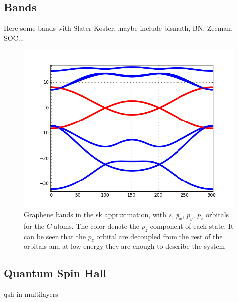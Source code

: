 \subsection{Bands}
Here some bands with Slater-Koster, maybe include bismuth, BN, Zeeman, SOC...
\begin{figure}[h!]
\centering
\includegraphics{chapter04/figures/graphene_bands.png}
\vspace{-5pt}
\caption{Graphene bands in the \ac{sk} approximation, with $s$, $p_x$, $p_y$, $p_z$ orbitals for the $C$ atoms. The color denote the $p_z$ component of each state. It can be seen that the $p_z$ orbital are decoupled from the rest of the orbitals and at low energy they are enough to describe the system}
\label{Gbands}
\end{figure}
\FloatBarrier

\subsection{Quantum Spin Hall}
\ac{qsh} in multilayers
